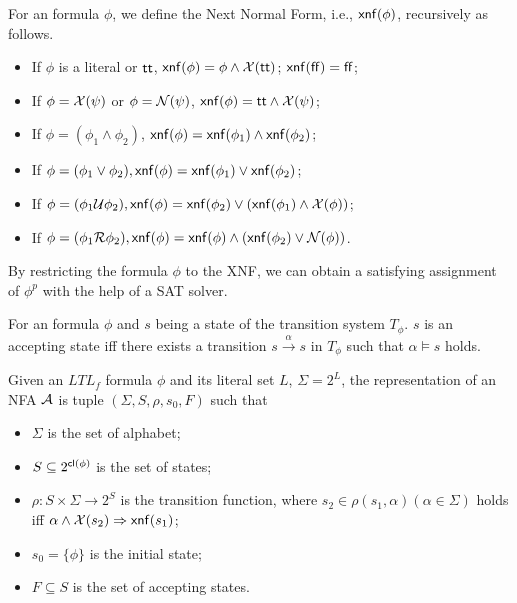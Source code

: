 \begin{definition}\label{def:xnf}
For an \ltlf formula $\phi$, we define the Next Normal Form, i.e., $\xnf(\phi)$, recursively as follows. 
\begin{itemize}
\item If $\phi$ is a literal or $\tt$, $\xnf(\phi) = \phi \wedge \X(\tt)$; $\xnf(\ff) = \ff$;
\item If $\phi = \X(\psi)$ or $\phi = \N(\psi)$, $\xnf(\phi) = \tt \wedge \X(\psi)$;
\item If $\phi = (\phi_1 \wedge \phi_2)$, $\xnf(\phi) = \xnf(\phi_1)\wedge\xnf(\phi_2)$;
\item If $\phi = (\phi_1 \vee \phi_2), \xnf(\phi) = \xnf(\phi_1)\vee \xnf(\phi_2)$; 
\item If $\phi = (\phi_1 \U \phi_2), \xnf(\phi) = \xnf(\phi_2) \vee (\xnf(\phi_1) \wedge \X(\phi))$; 
\item If $\phi = (\phi_1 \R \phi_2), \xnf(\phi) = \xnf(\phi)\wedge (\xnf(\phi_2) \vee \N(\phi))$.
\end{itemize}
\end{definition}

By restricting the \ltlf formula $\phi$ to the XNF, we can obtain a satisfying assignment of $\phi^{p}$ with the help of a SAT solver.

\begin{definition} 
For an \ltlf formula $\phi$ and $s$ being a state of the transition system $T_{\phi}$. $s$ is an accepting state iff there exists a transition $s \overset{\alpha}{\rightarrow}s$ in $T_{\phi}$ such that $\alpha \models s$ holds. 
\end{definition}
   
\begin{definition}\label{def:ltlf2nfa} 
Given an $LTL_f$ formula $\phi$ and its literal set $L$, $\Sigma = 2^{L}$, the representation of an NFA $\A$ is tuple $(\Sigma, S, \rho, s_0, F)$ such that
\begin{itemize}
	\item $\Sigma$ is the set of alphabet;
	\item $S\subseteq 2^{\cl(\phi)}$ is the set of states;
	\item $\rho:  S \times \Sigma \to 2^S$ is the transition function, where $s_2 \in \rho(s_1, \alpha) (\alpha \in \Sigma)$ holds iff $ \alpha \wedge \X(s_2) \Rightarrow \xnf(s_1)$;
	\item $s_0 = \{\phi \}$ is the initial state;
	\item $F\subseteq S$ is the set of accepting states. 
\end{itemize}
\end{definition}


